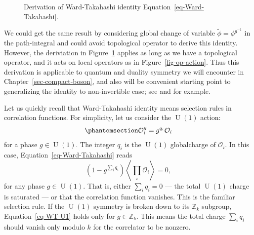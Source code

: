 \documentclass[11pt,toc=bibliography]{scrbook}
\DeclareMathOperator{\U}{U}
\numberwithin{equation}{section}
\DeclareMathOperator{\U}{U}
\begin{document}
\begin{figure}[t]


\caption{\label{fig-Ward-Takahashi}Derivation of Ward-Takahashi identity
Equation~\ref{eq-Ward-Takahashi}.}

\end{figure}%

We could get the same result by considering global change of variable
\(\widetilde{\phi} = \phi^{g^{-1}}\) in the path-integral and could
avoid topological operator to derive this identity. However, the
deriviation in Figure~\ref{fig-Ward-Takahashi} applies as long as we
have a topological operator, and it acts on local operators as in
Figure~\ref{fig-op-action}. Thus this derivation is applicable to
quantum and duality symmetry we will encounter in
Chapter~\ref{sec-compact-boson}, and also will be convenient starting
point to generalizing the identity to non-invertible case; see
\textcite{Cordova:2022ieu} and \textcite{Copetti:2023mcq} for example.

Let us quickly recall that Ward-Takahashi identity means selection rules
in correlation functions. For simplicity, let us consider the \(\U(1)\)
action: \begin{equation}\phantomsection\label{eq-WT-U1}{
\mathcal{O}_i^g = g^{q_i}\mathcal{O}_i
}\end{equation} for a phase \(g \in \U(1)\). The integer \(q_i\) is the
\(\U(1)\) globalcharge of \(\mathcal{O}_i\). In this case,
Equation~\ref{eq-Ward-Takahashi} reads \[ 
\left(1-g^{\sum_i q_i}\right)\left\langle \prod_i \mathcal{O}_i\right\rangle = 0,
\] for any phase \(g \in \U(1)\). That is, either \(\sum_i q_i =0\) ---
the total \(\U(1)\) charge is saturated --- or that the correlation
function vanishes. This is the familiar selection rule. If the \(\U(1)\)
symmetry is broken down to its \(\mathbb{Z}_k\) subgroup,
Equation~\ref{eq-WT-U1} holds only for \(g\in \mathbb{Z}_k\). This means
the total charge \(\sum_i q_i\) should vanish only modulo \(k\) for the
correlator to be nonzero.
\end{document}
